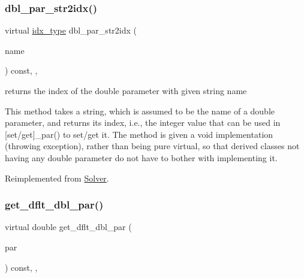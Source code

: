 \subsubsection{\texorpdfstring{dbl\+\_\+par\+\_\+str2idx()}{dbl\_par\_str2idx()}}
{\footnotesize\ttfamily virtual \mbox{\hyperlink{class_s_m_spp__di__unipi__it_1_1_thin_compute_interface_aa3d710629ad8c434286726ad810c3b47}{idx\+\_\+type}} dbl\+\_\+par\+\_\+str2idx (\begin{DoxyParamCaption}\item[{const std\+::string \&}]{name }\end{DoxyParamCaption}) const\hspace{0.3cm}{\ttfamily [inline]}, {\ttfamily [override]}, {\ttfamily [virtual]}}



returns the index of the double parameter with given string name 

This method takes a string, which is assumed to be the name of a double parameter, and returns its index, i.\+e., the integer value that can be used in \mbox{[}set/get\mbox{]}\+\_\+par() to set/get it. The method is given a void implementation (throwing exception), rather than being pure virtual, so that derived classes not having any double parameter do not have to bother with implementing it. 

Reimplemented from \mbox{\hyperlink{class_s_m_spp__di__unipi__it_1_1_solver_a6d353ac3d1200d9bea89235da61bc4f3}{Solver}}.

\mbox{\label{class_s_m_spp__di__unipi__it_1_1_c_d_a_solver_a465a771c115acf8d5f4e32e22f003014}} 
\subsubsection{\texorpdfstring{get\+\_\+dflt\+\_\+dbl\+\_\+par()}{get\_dflt\_dbl\_par()}}
{\footnotesize\ttfamily virtual double get\+\_\+dflt\+\_\+dbl\+\_\+par (\begin{DoxyParamCaption}\item[{const \mbox{\hyperlink{class_s_m_spp__di__unipi__it_1_1_thin_compute_interface_aa3d710629ad8c434286726ad810c3b47}{idx\+\_\+type}}}]{par }\end{DoxyParamCaption}) const\hspace{0.3cm}{\ttfamily [inline]}, {\ttfamily [override]}, {\ttfamily [virtual]}}



